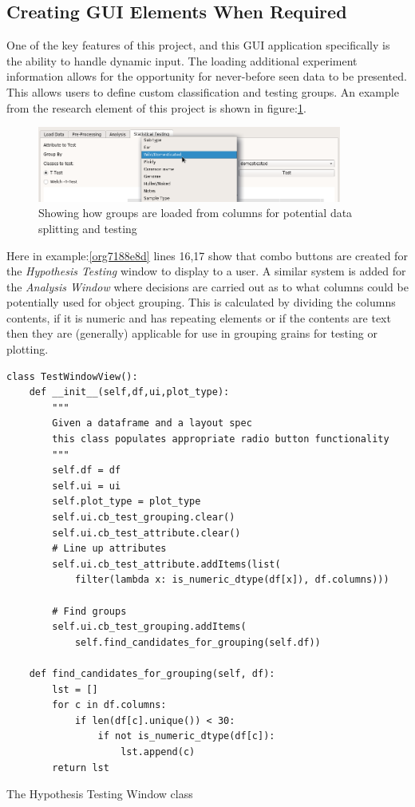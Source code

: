 \documentclass[11pt]{report}
\begin{document}
\subsection{Creating GUI Elements When Required}
\label{sec:orgbff0cf8}

One of the key features of this project, and this GUI application specifically is the ability to handle dynamic input. The loading additional experiment information allows for the opportunity for never-before seen data to be presented. This allows users to define custom classification and testing groups. An example from the research element of this project is shown in figure:\ref{fig:orgedb4cb3}.

\begin{figure}[htbp]
\centering
\includegraphics[width=10cm]{./images/dynamicselection.png}
\caption{\label{fig:orgedb4cb3}
Showing how groups are loaded from columns for potential data splitting and testing}
\end{figure}

Here in example:\ref{org7188e8d} lines 16,17 show that combo buttons are created for the \emph{Hypothesis Testing} window to display to a user. A similar system is added for the \emph{Analysis Window} where decisions are carried out as to what columns could be potentially used for object grouping. This is calculated by dividing the columns contents, if it is numeric and has repeating elements or if the contents are text then they are (generally) applicable for use in grouping grains for testing or plotting.

\begin{listing}[htbp]
\begin{verbatim}
class TestWindowView():
    def __init__(self,df,ui,plot_type):
        """
        Given a dataframe and a layout spec
        this class populates appropriate radio button functionality
        """
        self.df = df
        self.ui = ui
        self.plot_type = plot_type
        self.ui.cb_test_grouping.clear()
        self.ui.cb_test_attribute.clear()
        # Line up attributes
        self.ui.cb_test_attribute.addItems(list(
            filter(lambda x: is_numeric_dtype(df[x]), df.columns)))

        # Find groups
        self.ui.cb_test_grouping.addItems(
            self.find_candidates_for_grouping(self.df))

    def find_candidates_for_grouping(self, df):
        lst = []
        for c in df.columns:
            if len(df[c].unique()) < 30:
                if not is_numeric_dtype(df[c]):
                    lst.append(c)
        return lst
\end{verbatim}
\caption{\label{org7188e8d}
The Hypothesis Testing Window class}
\end{listing}
\end{document}
